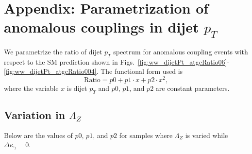 

\section{Appendix: Parametrization of anomalous couplings in dijet \texorpdfstring{$p_T$}{pT}}
We parametrize the ratio of dijet $p_T$ spectrum 
for anomalous coupling events with respect to the 
SM prediction shown in 
Figs.~\ref{fig:ww_dijetPt_atgcRatio06}-\ref{fig:ww_dijetPt_atgcRatio004}.
The functional form used is
\begin{equation}
\text{Ratio} = p0 + p1 \cdot x + p2 \cdot x^2,
\end{equation}
where the variable $x$ is dijet $p_T$ and 
$p0$, $p1$, and $p2$ are constant parameters.


\subsection{Variation in \texorpdfstring{$\Lambda_Z$}{LambdaZ}}
Below are the values of $p0$, $p1$, and $p2$ 
for samples where $\Lambda_Z$ is varied 
while $\Delta{\kappa_\gamma} = 0$.


